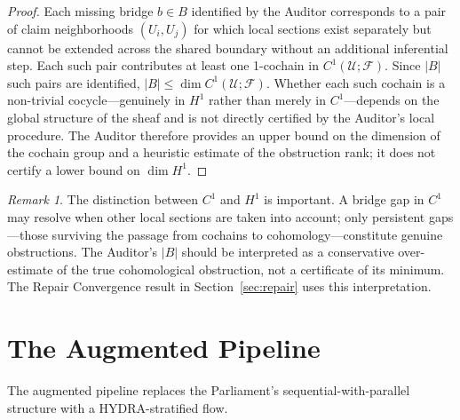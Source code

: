 \documentclass[12pt, a4paper]{article}
\theoremstyle{plain}
\theoremstyle{definition}
\theoremstyle{remark}
\newtheorem{remark}{Remark}
\begin{document}
\begin{proof}
Each missing bridge $b \in B$ identified by the Auditor corresponds to a pair of claim neighborhoods $(U_i, U_j)$ for which local sections exist separately but cannot be extended across the shared boundary without an additional inferential step. Each such pair contributes at least one 1-cochain in $C^1(\mathcal{U}; \mathcal{F})$. Since $|B|$ such pairs are identified, $|B| \leq \dim C^1(\mathcal{U}; \mathcal{F})$. Whether each such cochain is a non-trivial cocycle---genuinely in $H^1$ rather than merely in $C^1$---depends on the global structure of the sheaf and is not directly certified by the Auditor's local procedure. The Auditor therefore provides an upper bound on the dimension of the cochain group and a heuristic estimate of the obstruction rank; it does not certify a lower bound on $\dim H^1$.
\end{proof}

\begin{remark}
The distinction between $C^1$ and $H^1$ is important. A bridge gap in $C^1$ may resolve when other local sections are taken into account; only persistent gaps---those surviving the passage from cochains to cohomology---constitute genuine obstructions. The Auditor's $|B|$ should be interpreted as a conservative over-estimate of the true cohomological obstruction, not a certificate of its minimum. The Repair Convergence result in Section~\ref{sec:repair} uses this interpretation.
\end{remark}

\section{The Augmented Pipeline}
\label{sec:pipeline}

The augmented pipeline replaces the Parliament's sequential-with-parallel structure with a HYDRA-stratified flow.
\end{document}
